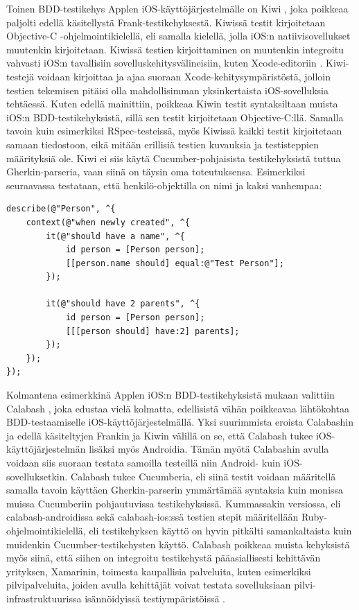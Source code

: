 \documentclass[finnish,nonumbib,nocopyright]{gradu2}
\begin{document}
Toinen BDD-testikehys Applen iOS-käyttöjärjestelmälle on Kiwi \cite{kiwi}, joka poikkeaa paljolti edellä käsitellystä Frank-testikehyksestä. Kiwissä testit kirjoitetaan Objective-C -ohjelmointikielellä, eli samalla kielellä, jolla iOS:n natiivisovellukset muutenkin kirjoitetaan. Kiwissä testien kirjoittaminen on muutenkin integroitu vahvasti iOS:n tavallisiin sovelluskehitysvälineisiin, kuten Xcode-editoriin \cite{xcode}. Kiwi-testejä voidaan kirjoittaa ja ajaa suoraan Xcode-kehitysympäristöstä, jolloin testien tekemisen pitäisi olla mahdollisimman yksinkertaista iOS-sovelluksia tehtäessä. Kuten edellä mainittiin, poikkeaa Kiwin testit syntaksiltaan muista iOS:n BDD-testikehyksistä, sillä sen testit kirjoitetaan Objective-C:llä. Samalla tavoin kuin esimerkiksi RSpec-testeissä, myös Kiwissä kaikki testit kirjoitetaan samaan tiedostoon, eikä mitään erillisiä testien kuvauksia ja testisteppien määrityksiä ole. Kiwi ei siis käytä Cucumber-pohjaisista testikehyksistä tuttua Gherkin-parseria, vaan siinä on täysin oma toteutuksensa. Esimerkiksi seuraavassa testataan, että henkilö-objektilla on nimi ja kaksi vanhempaa:
\begin{verbatim}
describe(@"Person", ^{
    context(@"when newly created", ^{
        it(@"should have a name", ^{
            id person = [Person person];
            [[person.name should] equal:@"Test Person"];
        });

        it(@"should have 2 parents", ^{
            id person = [Person person];
            [[[person should] have:2] parents];
        });
    });
});
\end{verbatim}

Kolmantena esimerkkinä Applen iOS:n BDD-testikehyksistä mukaan valittiin Calabash \cite{calabash}, joka edustaa vielä kolmatta, edellisistä vähän poikkeavaa lähtökohtaa BDD-testaamiselle iOS-käyttöjärjestelmällä. Yksi suurimmista eroista Calabashin ja edellä käsiteltyjen Frankin ja Kiwin välillä on se, että Calabash tukee iOS-käyttöjärjestelmän lisäksi myös Androidia. Tämän myötä Calabashin avulla voidaan siis suoraan testata samoilla testeillä niin Android- kuin iOS-sovelluksetkin. Calabash tukee Cucumberia, eli siinä testit voidaan määritellä samalla tavoin käyttäen Gherkin-parserin ymmärtämää syntaksia kuin monissa muissa Cucumberiin pohjautuvissa testikehyksissä. Kummassakin versiossa, eli calabash-androidissa \cite{calabashandroid} sekä calabash-ios:ssä \cite{calabashios} testien stepit määritellään Ruby-ohjelmointikielellä, eli testikehyksen käyttö on hyvin pitkälti samankaltaista kuin muidenkin Cucumber-testikehysten käyttö. Calabash poikkeaa muista kehyksistä myös siinä, että siihen on integroitu testikehystä pääasiallisesti kehittävän yrityksen, Xamarinin, toimesta kaupallisia palveluita, kuten esimerkiksi pilvipalveluita, joiden avulla kehittäjät voivat testata sovelluksiaan pilvi-infrastruktuurissa isännöidyissä testiympäristöissä \cite{xamarincloud}.
\end{document}
